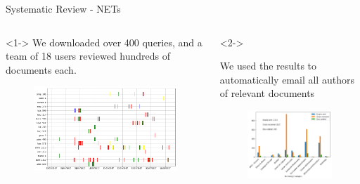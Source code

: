 \documentclass[9pt]{beamer}
\begin{document}
\begin{frame}{Systematic Review - NETs}
\begin{columns}
	\begin{column}{0.5\linewidth}<1->
		We downloaded over 400 queries, and a team of 18 users reviewed hundreds of documents each.
		\begin{figure}
			\includegraphics[width=1\linewidth]{images/ratings_user_time}
		\end{figure}
	\end{column}
	\begin{column}{0.5\linewidth}<2->
		\bigskip
		\bigskip
		
		We used the results to automatically email all authors of relevant documents
	\begin{figure}
		\includegraphics[width=1\linewidth]{images/emails_responses}
	\end{figure}
	\end{column}
\end{columns}

\end{frame}
\end{document}
